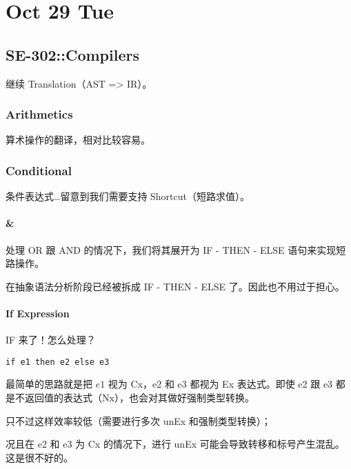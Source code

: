 \documentclass[
]{article}
\date{}
\begin{document}
\hypertarget{header-n0}{%
\section{Oct 29 Tue}\label{header-n0}}

\hypertarget{header-n2}{%
\subsection{SE-302::Compilers}\label{header-n2}}

继续 Translation（AST =\textgreater{} IR）。

\hypertarget{header-n4}{%
\subsubsection{Arithmetics}\label{header-n4}}

算术操作的翻译，相对比较容易。

\hypertarget{header-n6}{%
\subsubsection{Conditional}\label{header-n6}}

条件表达式\ldots 留意到我们需要支持 Shortcut（短路求值）。

\hypertarget{header-n8}{%
\paragraph{\& \textbar{}}\label{header-n8}}

处理 OR 跟 AND 的情况下，我们将其展开为 IF - THEN - ELSE
语句来实现短路操作。

在抽象语法分析阶段已经被拆成 IF - THEN - ELSE 了。因此也不用过于担心。

\hypertarget{header-n11}{%
\paragraph{If Expression}\label{header-n11}}

IF 来了！怎么处理？

\texttt{if\ e1\ then\ e2\ else\ e3}

最简单的思路就是把 \(e1\) 视为 Cx，e2 和 e3 都视为 Ex 表达式。即使 e2 跟
e3 都是不返回值的表达式（Nx），也会对其做好强制类型转换。

只不过这样效率较低（需要进行多次 unEx 和强制类型转换）；

况且在 e2 和 e3 为 Cx 的情况下，进行 unEx
可能会导致转移和标号产生混乱。这是很不好的。
\end{document}
